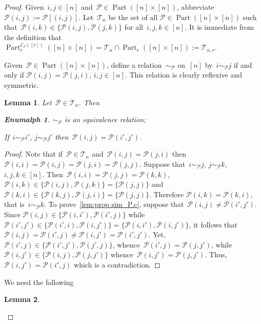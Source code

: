 \documentclass[10pt,a4paper]{amsart}
\newtheorem{lemma}{Lemma}
\newtheorem{enumalph}{Enumalph}
\DeclareMathOperator{\Part}{Part}
\begin{document}
\begin{proof}
Given~$i,j\in[n]$ and~$\mathcal P\in\Part([n]\times[n])$,
abbreviate~$\mathcal P(i,j):=\mathcal P[(i,j)]$.
Let~$\mathscr T_n$ be the set of all $\mathcal P\in \Part([n]\times[n])$
such that~$\mathcal P(i,k)\in\{\mathcal P(i,j),\mathcal P(j,k)\}$ for all~$i,j,k\in[n]$. 
It is immediate from the definition that~$\Part_r^{\mathcal E_\Gamma([r])}([n]\times[n])
=\mathscr T_n\cap \Part_r([n]\times[n]):=\mathscr T_{n,r}$.


Given~$\mathcal P\in\Part([n]\times[n])$, define a relation~$\sim_{\mathcal P}$
on~$[n]$ by~$i\sim_{\mathcal P}j$ if and only if $\mathcal P(i,j)=\mathcal P(j,i)$,
$i,j\in[n]$. This relation is clearly reflexive and symmetric.
\begin{lemma}\label{lem:prop sim_P}
Let~$\mathcal P\in\mathscr T_n$. Then
\begin{enumalph}
\item\label{lem:prop sim_P.a} $\sim_{\mathcal P}$ is an equivalence relation;
\item\label{lem:prop sim_P.c} If~$i\sim_{\mathcal P}i'$,
$j\sim_{\mathcal P}j'$ then~$\mathcal P(i,j)=\mathcal P(i',j')$.
\end{enumalph}
\end{lemma}
\begin{proof}
Note that if~$\mathcal P\in\mathscr T_n$ and~$\mathcal P(i,j)=\mathcal P(j,i)$
then~$\mathcal P(i,i)=\mathcal P(i,j)=\mathcal P(j,i)=\mathcal P(j,j)$.
Suppose that~$i\sim_{\mathcal P}j$, $j\sim_{\mathcal P}k$, $i,j,k\in[n]$. Then~$\mathcal P(i,i)=\mathcal P(j,j)=\mathcal P(k,k)$,
$\mathcal P(i,k)\in\{\mathcal P(i,j),\mathcal P(j,k)\}=\{\mathcal P(j,j)\}$
and~$\mathcal P(k,i)\in\{\mathcal P(k,j),\mathcal P(j,i)\}=\{\mathcal P(j,j)\}$.
Therefore $\mathcal P(i,k)=\mathcal P(k,i)$, that is~$i\sim_{\mathcal P}k$.
To prove~\ref{lem:prop sim_P.c}, 
suppose that~$\mathcal P(i,j)\not=\mathcal P(i',j')$. Since
$\mathcal P(i,j)\in\{\mathcal P(i,i'),\mathcal P(i',j)\}$ while
$\mathcal P(i',j')\in\{\mathcal P(i',i),\mathcal P(i,j')\}=
\{\mathcal P(i,i'),\mathcal P(i,j')\}$, it follows that~$\mathcal P(i,j)=
\mathcal P(i',j)\not=\mathcal P(i,j')=\mathcal P(i',j')$. Yet,
$\mathcal P(i',j)\in\{\mathcal P(i',j'),\mathcal P(j',j)\}$, whence~$\mathcal P(i',j)=\mathcal P(j,j')$, while~$\mathcal P(i,j')\in\{\mathcal P(i,j),\mathcal P(j,j')\}$ whence~$\mathcal P(i,j')=\mathcal P(j,j')$. Thus, $\mathcal P(i,j')=\mathcal P(i',j)$ which is a contradiction.
\end{proof}
We need the following
\begin{lemma}\label{lem:surj map part}

\end{lemma}
\end{proof}
\end{document}
